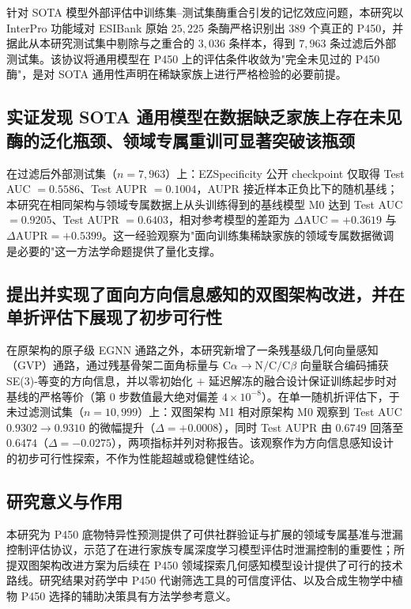 针对 SOTA 模型外部评估中训练集--测试集酶重合引发的记忆效应问题，本研究以 InterPro\cite{Blum2025} 功能域对 ESIBank 原始 $25{,}225$ 条酶严格识别出 $389$ 个真正的 P450，并据此从本研究测试集中剔除与之重合的 $3{,}036$ 条样本，得到 $7{,}963$ 条过滤后外部测试集。该协议将通用模型在 P450 上的评估条件收敛为"完全未见过的 P450 酶"，是对 SOTA 通用性声明在稀缺家族上进行严格检验的必要前提。

\subsection{实证发现 SOTA 通用模型在数据缺乏家族上存在未见酶的泛化瓶颈、领域专属重训可显著突破该瓶颈}
\label{subsec:contrib-finding}

在过滤后外部测试集（$n=7{,}963$）上：EZSpecificity 公开 checkpoint 仅取得 Test AUC $= 0.5586$、Test AUPR $= 0.1004$，AUPR 接近样本正负比下的随机基线；本研究在相同架构与领域专属数据上从头训练得到的基线模型 M0 达到 Test AUC $= 0.9205$、Test AUPR $= 0.6403$，相对参考模型的差距为 $\Delta\mathrm{AUC} = +0.3619$ 与 $\Delta\mathrm{AUPR} = +0.5399$。这一经验观察为"面向训练集稀缺家族的领域专属数据微调是必要的"这一方法学命题提供了量化支撑。

\subsection{提出并实现了面向方向信息感知的双图架构改进，并在单折评估下展现了初步可行性}
\label{subsec:contrib-arch}

在原架构的原子级 EGNN 通路之外，本研究新增了一条残基级几何向量感知（GVP）通路，通过残基骨架二面角标量与 $\mathrm{C}\alpha \to \mathrm{N/C/C}\beta$ 向量联合编码捕获 SE(3)-等变的方向信息，并以零初始化 $+$ 延迟解冻的融合设计保证训练起步时对基线的严格等价（第 0 步数值最大绝对偏差 $4 \times 10^{-8}$）。在单一随机折评估下，于未过滤测试集（$n=10{,}999$）上：双图架构 M1 相对原架构 M0 观察到 Test AUC $0.9302 \to 0.9310$ 的微幅提升（$\Delta = +0.0008$），同时 Test AUPR 由 $0.6749$ 回落至 $0.6474$（$\Delta = -0.0275$），两项指标并列对称报告。该观察作为方向信息感知设计的初步可行性探索，不作为性能超越或稳健性结论。

\subsection{研究意义与作用}
\label{subsec:contrib-impact}

本研究为 P450 底物特异性预测提供了可供社群验证与扩展的领域专属基准与泄漏控制评估协议，示范了在进行家族专属深度学习模型评估时泄漏控制的重要性；所提双图架构改进方案为后续在 P450 领域探索几何感知模型设计提供了可行的技术路线。研究结果对药学中 P450 代谢筛选工具的可信度评估、以及合成生物学中植物 P450 选择的辅助决策具有方法学参考意义。

